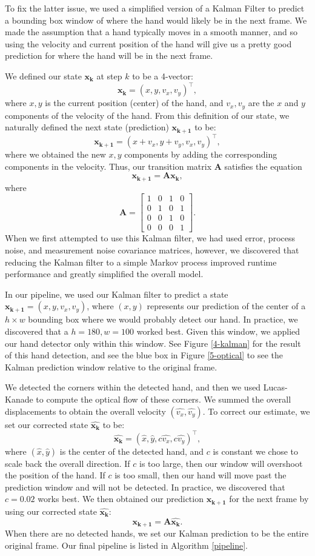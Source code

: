 \documentclass[12pt]{article}
\newcommand{\m}[1]{\mathbf{#1}}
\newcommand{\transpose}[1]{{#1}^\top}
\begin{document}
To fix the latter issue, we used a simplified version of a Kalman Filter \cite{kalmanfilter} to predict a bounding box window of where the hand would likely be in the next frame. We made the assumption that a hand typically moves in a smooth manner, and so using the velocity and current position of the hand will give us a pretty good prediction for where the hand will be in the next frame. 

We defined our state $\m{x_k}$ at step $k$ to be a 4-vector:
$$\m{x_k} = \transpose{(x, y, v_x, v_y)},$$
where $x,y$ is the current position (center) of the hand, and $v_x, v_y$ are the $x$ and $y$ components of the velocity of the hand. From this definition of our state, we naturally defined the next state (prediction) $\m{x_{k+1}}$ to be:
$$\m{x_{k+1}} = \transpose{(x + v_x, y + v_y, v_x, v_y)},$$
where we obtained the new $x,y$ components by adding the corresponding components in the velocity. Thus, our transition matrix $\m{A}$ satisfies the equation
$$\m{x_{k+1}} = \m{A} \m{x_k},$$
where
$$\m{A} = 
\begin{bmatrix}
1 & 0 & 1 & 0 \\
0 & 1 & 0 & 1 \\
0 & 0 & 1 & 0 \\
0 & 0 & 0 & 1
\end{bmatrix}.
$$
When we first attempted to use this Kalman filter, we had used error, process noise, and measurement noise covariance matrices, however, we discovered that reducing the Kalman filter to a simple Markov process improved runtime performance and greatly simplified the overall model. 

In our pipeline, we used our Kalman filter to predict a state $\m{x_{k+1}} = (x,y,v_x,v_y)$, where $(x,y)$ represents our prediction of the center of a $h \times w$ bounding box where we would probably detect our hand. In practice, we discovered that a $h = 180, w = 100$ worked best. Given this window, we applied our hand detector only within this window. See Figure \ref{4-kalman} for the result of this hand detection, and see the blue box in Figure \ref{5-optical} to see the Kalman prediction window relative to the original frame. 

We detected the corners within the detected hand, and then we used Lucas-Kanade \cite{lucaskanade} to compute the optical flow of these corners. We summed the overall displacements to obtain the overall velocity $(\hat{v_x}, \hat{{v_y}})$. To correct our estimate, we set our corrected state $\m{\hat{x_k}}$ to be:
$$\m{\hat{x_k}} = \transpose{(\hat{x}, \hat{y}, c\hat{v_x}, c\hat{v_y})},$$
where $(\hat{x},\hat{y})$ is the center of the detected hand, and $c$ is constant we chose to scale back the overall direction. If $c$ is too large, then our window will overshoot the position of the hand. If $c$ is too small, then our hand will move past the prediction window and will not be detected. In practice, we discovered that $c = 0.02$ works best. We then obtained our prediction $\m{x_{k+1}}$ for the next frame by using our corrected state $\m{\hat{x_k}}$:
$$\m{x_{k+1}} = \m{A} \m{\hat{x_k}}.$$
When there are no detected hands, we set our Kalman prediction to be the entire original frame. Our final pipeline is listed in Algorithm \ref{pipeline}.
\end{document}
